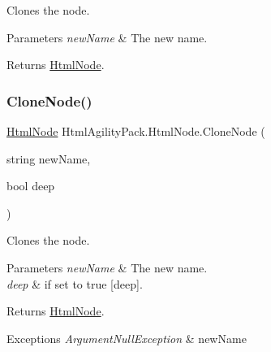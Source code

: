 Clones the node. 


\begin{DoxyParams}{Parameters}
{\em new\+Name} & The new name.\\
\hline
\end{DoxyParams}
\begin{DoxyReturn}{Returns}
\hyperlink{class_html_agility_pack_1_1_html_node}{Html\+Node}.
\end{DoxyReturn}
\mbox{\label{class_html_agility_pack_1_1_html_node_a677ad99a5b43a112bdca998a566227f8}} 
\subsubsection{\texorpdfstring{Clone\+Node()}{CloneNode()}\hspace{0.1cm}{\footnotesize\ttfamily [3/3]}}
{\footnotesize\ttfamily \hyperlink{class_html_agility_pack_1_1_html_node}{Html\+Node} Html\+Agility\+Pack.\+Html\+Node.\+Clone\+Node (\begin{DoxyParamCaption}\item[{string}]{new\+Name,  }\item[{bool}]{deep }\end{DoxyParamCaption})\hspace{0.3cm}{\ttfamily [inline]}}



Clones the node. 


\begin{DoxyParams}{Parameters}
{\em new\+Name} & The new name.\\
\hline
{\em deep} & if set to {\ttfamily true} \mbox{[}deep\mbox{]}.\\
\hline
\end{DoxyParams}
\begin{DoxyReturn}{Returns}
\hyperlink{class_html_agility_pack_1_1_html_node}{Html\+Node}.
\end{DoxyReturn}

\begin{DoxyExceptions}{Exceptions}
{\em Argument\+Null\+Exception} & new\+Name\\
\hline
\end{DoxyExceptions}
\mbox{\label{class_html_agility_pack_1_1_html_node_a7d1a61d5e9eeae58966572bcd0a712b1}} 
